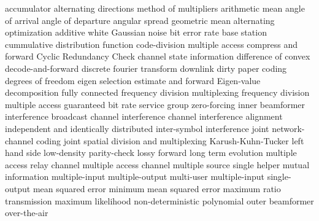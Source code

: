 
 {accumulator}
 {alternating directions method of multipliers}
   {arithmetic mean}
 {angle of arrival}
 {angle of departure}
 {angular spread}
   {geometric mean}
   {alternating optimization}
   {additive white Gaussian noise}
   {bit error rate}
   {base station}
 {cummulative distribution function}
   {code-division multiple access}
 {compress and forward}
 {Cyclic Redundancy Check}
   {channel state information}
 {difference of convex}
 {decode-and-forward}
 {discrete fourier transform}
   {downlink}
   {dirty paper coding}
   {degrees of freedom}
 	{eigen selection}
 {estimate and forward }
 {Eigen-value decomposition}
 {fully connected}
   {frequency division multiplexing}
   {frequency division multiple access}
   {guaranteed bit rate service}
 {group zero-forcing}
 {inner beamformer}
   {interference broadcast channel}
   {interference channel}
   {interference alignment}
   {independent and identically distributed}
   {inter-symbol interference}
 {joint network-channel coding}
 {joint spatial division and multiplexing}
   {Karush-Kuhn-Tucker}
 {left hand side}
 {low-density parity-check}
 {lossy forward}
   {long term evolution}
 {multiple access relay channel}
 {multiple access channel}
 {multiple source single helper}
 {mutual information}
   {multiple-input multiple-output}
   {multi-user}
   {multiple-input single-output}
   {mean squared error}
   {minimum mean squared error}
   {maximum ratio transmission}
   {maximum likelihood}
   {non-deterministic polynomial}
 {outer beamformer}
   {over-the-air}
